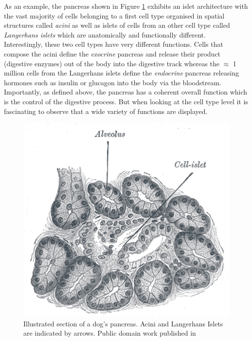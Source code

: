         
     As an example, the pancreas shown in Figure \ref{fig:pancreas} exhibits an islet architecture \citep{brissova05} with the vast majority of cells belonging to a first cell type organised in spatial structures called \emph{acini} as well as islets of cells from an other cell type called \emph{Langerhans islets} which are anatomically and functionally different.\\
     
      Interestingly, these two cell types have very different functions. Cells that compose the acini define the \emph{exocrine} pancreas and release their product (digestive enzymes) out of the body into the digestive track \citep{rodriguez11} whereas the $\approx$ 1 million cells \citep{hellman09} from the Langerhans islets define the \emph{endocrine} pancreas releasing hormones such as insulin or glucagon into the body via the bloodstream. Importantly, as defined above, the pancreas has a coherent overall function which is the control of the digestive process. But when looking at the cell type level it is fascinating to observe that a wide variety of functions are displayed.\\
     
\begin{figure}[bth]
\begin{center}
  \includegraphics[width=0.8\linewidth]{gfx/chapter1/pancreas.png}
\end{center}
  \caption{Illustrated section of a dog's pancreas. Acini and Langerhans Islets are indicated by arrows. Public domain work published in \citep{williams80}}
  \label{fig:pancreas}
\end{figure}
    

